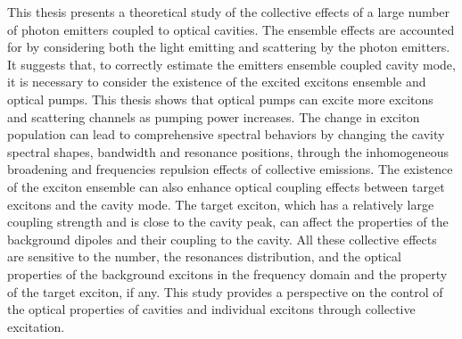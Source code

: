 This thesis presents a theoretical study of the collective effects of a large number of photon emitters coupled to optical cavities. The ensemble effects are accounted for by considering both the light emitting and scattering by the photon emitters. It suggests that, to correctly estimate the emitters ensemble coupled cavity mode, it is necessary to consider the existence of the excited excitons ensemble and optical pumps. This thesis shows that optical pumps can excite more excitons and scattering channels as pumping power increases. The change in exciton population can lead to comprehensive spectral behaviors by changing the cavity spectral shapes, bandwidth and resonance positions, through the inhomogeneous broadening and frequencies repulsion effects of collective emissions. The existence of the exciton ensemble can also enhance optical coupling effects between target excitons and the cavity mode. The target exciton, which has a relatively large coupling strength and is close to the cavity peak, can affect the properties of the background dipoles and their coupling to the cavity. All these collective effects are sensitive to the number, the resonances distribution, and the optical properties of the background excitons in the frequency domain and the property of the target exciton, if any. This study provides a perspective on the control of the optical properties of cavities and individual excitons through collective excitation.
